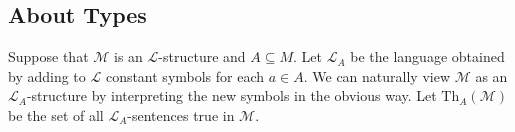 \documentclass{amsart}
\newtheorem{theorem}{Theorem}[subsection]
\newtheorem{lemma}[theorem]{Lemma}
\newtheorem{proposition}[theorem]{Proposition}
\newtheorem{corollary}[theorem]{Corollary}
\theoremstyle{definition}
\numberwithin{equation}{section}
\begin{document}










\subsection{About Types}
Suppose that $\mathcal{M}$ is an $\mathcal{L}$-structure and $A \subseteq M$.
Let $\mathcal{L}_A$ be the language obtained by adding to $\mathcal{L}$ constant symbols for each $a\in A$.
We can naturally view $\mathcal{M}$ as an $\mathcal{L}_A$-structure by interpreting the new symbols in the obvious way.
Let $\mathrm{Th}_A(\mathcal{M})$ be the set of all $\mathcal{L}_A$-sentences true in $\mathcal{M}$.
\end{document}
